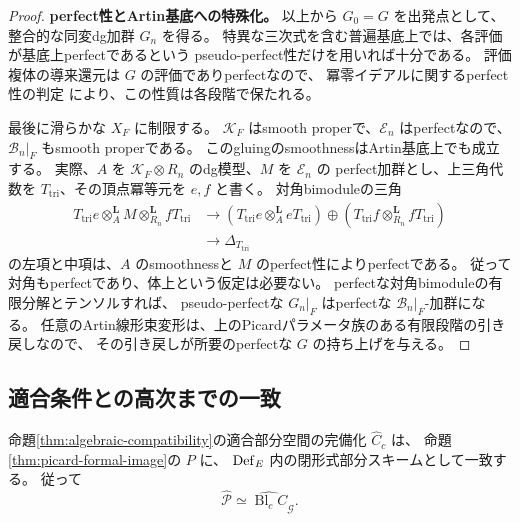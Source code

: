 \begin{proof}
\textbf{perfect性とArtin基底への特殊化。}
以上から $G_0=G$ を出発点として、整合的な同変dg加群 $G_n$ を得る。
特異な三次式を含む普遍基底上では、各評価が基底上perfectであるという
pseudo-perfect性だけを用いれば十分である。
評価複体の導来還元は $G$ の評価でありperfectなので、
冪零イデアルに関するperfect性の判定\cite[Lemma 15.80.4, Tag 07LU]{StacksNilPerfect}
により、この性質は各段階で保たれる。

最後に滑らかな $X_F$ に制限する。
$\mathcal K_F$ はsmooth properで、$\mathcal E_n$ はperfectなので、
$\mathcal B_n|_F$ もsmooth properである。
このgluingのsmoothnessはArtin基底上でも成立する。
実際、$A$ を $\mathcal K_F\otimes R_n$ のdg模型、$M$ を $\mathcal E_n$ の
perfect加群とし、上三角代数を $T_{\mathrm{tri}}$、その頂点冪等元を $e,f$ と書く。
対角bimoduleの三角
\[
 \begin{split}
 T_{\mathrm{tri}}e\otimes_A^{\mathbf L}M\otimes_{R_n}^{\mathbf L}fT_{\mathrm{tri}}
 &\longrightarrow
 (T_{\mathrm{tri}}e\otimes_A^{\mathbf L}eT_{\mathrm{tri}})
 \oplus(T_{\mathrm{tri}}f\otimes_{R_n}^{\mathbf L}fT_{\mathrm{tri}})\\
 &\longrightarrow\Delta_{T_{\mathrm{tri}}}
 \end{split}
\]
の左項と中項は、$A$ のsmoothnessと $M$ のperfect性によりperfectである。
従って対角もperfectであり、体上という仮定は必要ない。
perfectな対角bimoduleの有限分解とテンソルすれば、
pseudo-perfectな $G_n|_F$ はperfectな $\mathcal B_n|_F$-加群になる。
任意のArtin線形束変形は、上のPicardパラメータ族のある有限段階の引き戻しなので、
その引き戻しが所要のperfectな $G$ の持ち上げを与える。
\end{proof}

\subsection{適合条件との高次までの一致}

\begin{theorem}[適合部分空間の幾何学的記述]\label{thm:picard-compatibility-equality}
命題\ref{thm:algebraic-compatibility}の適合部分空間の完備化 $\widehat C_c$ は、
命題\ref{thm:picard-formal-image}の $P$ に、
$\operatorname{Def}_E$ 内の閉形式部分スキームとして一致する。
従って
\[
 \widehat{\mathcal P}
 \simeq\widehat{\operatorname{Bl}_c C}_{\mathcal G}.
\]
\end{theorem}

